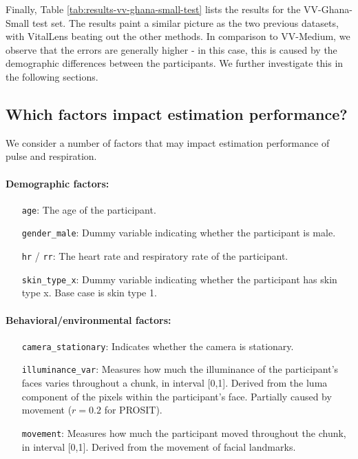 \documentclass{article}
\begin{document}
Finally, Table \ref{tab:results-vv-ghana-small-test} lists the results for the VV-Ghana-Small test set.
The results paint a similar picture as the two previous datasets, with VitalLens beating out the other methods.
In comparison to VV-Medium, we observe that the errors are generally higher - in this case, this is caused by the demographic differences between the participants.
We further investigate this in the following sections.

\subsection{Which factors impact estimation performance?}

We consider a number of factors that may impact estimation performance of pulse and respiration.

\paragraph{Demographic factors:}

\begin{enumerate}[align=left]
	\item[\texttt{age}:] The age of the participant.
	\item[\texttt{gender\_male}:] Dummy variable indicating whether the participant is male.
	\item[\texttt{hr} / \texttt{rr}:] The heart rate and respiratory rate of the participant.
	\item[\texttt{skin\_type\_x}:] Dummy variable indicating whether the participant has skin type x. Base case is skin type 1.
\end{enumerate}

\paragraph{Behavioral/environmental factors:}

\begin{enumerate}[align=left]
	\item[\texttt{camera\_stationary}:] Indicates whether the camera is stationary.
	\item[\texttt{illuminance\_var}:] Measures how much the illuminance of the participant's faces varies throughout a chunk, in interval [0,1]. Derived from the luma component of the pixels within the participant's face. Partially caused by movement ($r = 0.2$ for PROSIT).
	\item[\texttt{movement}:] Measures how much the participant moved throughout the chunk, in interval [0,1]. Derived from the movement of facial landmarks.
\end{enumerate}
\end{document}
